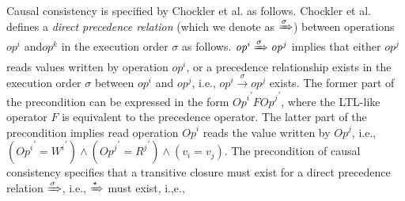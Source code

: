 \documentclass{sig-alternate-05-2015}
\begin{document}
 \par Causal consistency is specified by Chockler et al. as follows. Chockler et al. defines a
\emph{direct precedence relation} (which we denote as $\xRightarrow{\sigma}$) between operations $\mathit{op}^i$
 and$\mathit{op}^k$ in the execution order $\sigma$ as follows. $\mathit{op}^i \xRightarrow{\sigma} \mathit{op}^j$
  implies that either $\mathit{op}^j$ reads values written by operation $\mathit{op}^i$, or  a precedence relationship
exists in the execution order $\sigma$ between $\mathit{op}^i$  and $\mathit{op}^j$, i.e.,
$\mathit{op}^i \xrightarrow{\sigma}\mathit{op}^j$ exists. The former part of the precondition can be expressed in the
 form ${\mathit{Op}^i}^{'} F {\mathit{Op}^j}^{'}$, where the LTL-like operator $F$ is equivalent to the precedence operator.
 The latter part of the precondition implies read operation $\mathit{Op}^i$ reads the value
 written by $\mathit{Op}^j$, i.e., $ \left( {\mathit{Op}^i}^{'} = {W^i}^{'} \right) \wedge \left( {\mathit{Op}^j}^{'} = {R^j}^{'} \right) \wedge
   \left( v_i = v_j \right)$. The precondition of causal consistency specifies that a transitive closure
must exist for a direct precedence relation $\xRightarrow{\sigma}$, i.e., $\xRightarrow{\star}$ must exist, i.,e.,
\end{document}
